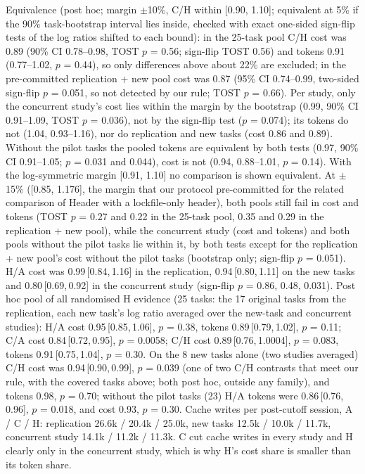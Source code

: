 \documentclass[11pt]{article}
\newcommand{\ci}[2]{\,[#1,\,#2]}
\newcommand{\aHeader}{\textsf{Header}\xspace}
\begin{document}
Equivalence (post hoc; margin $\pm$10\%, C/H within [0.90, 1.10]; equivalent at 5\% if the 90\% task-bootstrap interval lies inside, checked with exact one-sided sign-flip tests of the log ratios shifted to each bound): in the 25-task pool C/H cost was 0.89 (90\% CI 0.78--0.98, TOST $p$ = 0.56; sign-flip TOST 0.56) and tokens 0.91 (0.77--1.02, $p$ = 0.44), so only differences above about 22\% are excluded; in the pre-committed replication + new pool cost was 0.87 (95\% CI 0.74--0.99, two-sided sign-flip $p$ = 0.051, so not detected by our rule; TOST $p$ = 0.66). Per study, only the concurrent study's cost lies within the margin by the bootstrap (0.99, 90\% CI 0.91--1.09, TOST $p$ = 0.036), not by the sign-flip test ($p$ = 0.074); its tokens do not (1.04, 0.93--1.16), nor do replication and new tasks (cost 0.86 and 0.89). Without the pilot tasks the pooled tokens are equivalent by both tests (0.97, 90\% CI 0.91--1.05; $p$ = 0.031 and 0.044), cost is not (0.94, 0.88--1.01, $p$ = 0.14). With the log-symmetric margin [0.91, 1.10] no comparison is shown equivalent. At $\pm$15\% ([0.85, 1.176], the margin that our protocol pre-committed for the related comparison of \aHeader with a lockfile-only header), both pools still fail in cost and tokens (TOST $p$ = 0.27 and 0.22 in the 25-task pool, 0.35 and 0.29 in the replication + new pool), while the concurrent study (cost and tokens) and both pools without the pilot tasks lie within it, by both tests except for the replication + new pool's cost without the pilot tasks (bootstrap only; sign-flip $p$ = 0.051).
H/A cost was 0.99\ci{0.84}{1.16} in the replication, 0.94\ci{0.80}{1.11} on the new tasks and 0.80\ci{0.69}{0.92} in the concurrent study (sign-flip $p$ = 0.86, 0.48, 0.031).
Post hoc pool of all randomised H evidence (25 tasks: the 17 original tasks from the replication, each new task's log ratio averaged over the new-task and concurrent studies): H/A cost 0.95\ci{0.85}{1.06}, $p$ = 0.38, tokens 0.89\ci{0.79}{1.02}, $p$ = 0.11; C/A cost 0.84\ci{0.72}{0.95}, $p$ = 0.0058; C/H cost 0.89\ci{0.76}{1.0004}, $p$ = 0.083, tokens 0.91\ci{0.75}{1.04}, $p$ = 0.30. On the 8 new tasks alone (two studies averaged) C/H cost was 0.94\ci{0.90}{0.99}, $p$ = 0.039 (one of two C/H contrasts that meet our rule, with the covered tasks above; both post hoc, outside any family), and tokens 0.98, $p$ = 0.70; without the pilot tasks (23) H/A tokens were 0.86\ci{0.76}{0.96}, $p$ = 0.018, and cost 0.93, $p$ = 0.30.
Cache writes per post-cutoff session, A / C / H: replication 26.6k / 20.4k / 25.0k, new tasks 12.5k / 10.0k / 11.7k, concurrent study 14.1k / 11.2k / 11.3k. C cut cache writes in every study and H clearly only in the concurrent study, which is why H's cost share is smaller than its token share.
\end{document}
